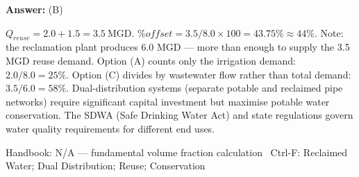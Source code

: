 \documentclass[11pt]{article}
\begin{document}
\vspace{2pt}\par\noindent\colorbox{boxbg}{\parbox{\dimexpr\linewidth-2\fboxsep\relax}{%
\vspace{2pt}\textbf{Answer:} (B)\par\vspace{2pt}
{\small $Q_{reuse} = 2.0 + 1.5 = 3.5\ \mathrm{MGD}$.  $\% offset = 3.5/8.0\times100 = 43.75\%\approx44\%$. Note: the reclamation plant produces 6.0 MGD --- more than enough to supply the 3.5 MGD reuse demand. Option (A) counts only the irrigation demand: $2.0/8.0 = 25\%$. Option (C) divides by wastewater flow rather than total demand: $3.5/6.0 = 58\%$. Dual-distribution systems (separate potable and reclaimed pipe networks) require significant capital investment but maximise potable water conservation. The SDWA (Safe Drinking Water Act) and state regulations govern water quality requirements for different end uses.}\par\vspace{2pt}
{\footnotesize\color{soft}Handbook: N/A --- fundamental volume fraction calculation \textbullet\ Ctrl-F: Reclaimed Water; Dual Distribution; Reuse; Conservation}\vspace{2pt}
}}
\vspace{9pt}
\end{document}
